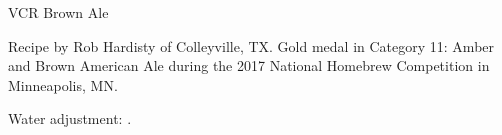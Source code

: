 \begin{recipe}{VCR Brown Ale}

\begin{aboutblock}
Recipe by Rob Hardisty of Colleyville, TX. Gold medal in Category 11: Amber and
Brown American Ale during the 2017 National Homebrew Competition in Minneapolis, MN.
\sourceaha
\end{aboutblock}


\begin{methodandtiming}

\begin{mashsteps}
\end{mashsteps}

\begin{fermentationsteps}
\end{fermentationsteps}

\begin{directions}
Water adjustment: .
\end{directions}

\end{methodandtiming}

\recipebreak

\begin{ingredientsblock}

\begin{malts}
\end{malts}

\begin{hops}
\end{hops}


\end{ingredientsblock}

\end{recipe}
